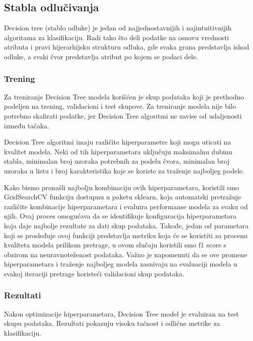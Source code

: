 \documentclass[a4paper,12pt]{article}
\begin{document}
\clearpage

\subsection{Stabla odlučivanja}
Decision tree (stablo odluke) je jedan od najjednostavnijih i najintuitivnijih algoritama za klasifikaciju. Radi tako što deli podatke na osnovu vrednosti atributa i pravi hijerarhijsku strukturu odluka, gde svaka grana predstavlja ishod odluke, a svaki čvor predstavlja atribut po kojem se podaci dele.


\subsubsection{Trening}

Za treniranje Decision Tree modela korišćen je skup podataka koji je prethodno podeljen na trening, validacioni i test skupove. Za treniranje modela nije bilo potrebno skalirati podatke, jer Decision Tree algoritmi ne zavise od udaljenosti između tačaka.

Decision Tree algoritmi imaju različite hiperparametre koji mogu uticati na kvalitet modela. Neki od tih hiperparametara uključuju maksimalnu dubinu stabla, minimalan broj uzoraka potrebnih za podelu čvora, minimalan broj uzoraka u listu i broj karakteristika koje se koriste za traženje najboljeg podele.

Kako bismo pronašli najbolju kombinaciju ovih hiperparametara, koristili smo GridSearchCV funkciju dostupnu u paketu sklearn, koja automatski pretražuje različite kombinacije hiperparametara i evaluira performanse modela za svaku od njih. Ovaj proces omogućava da se identifikuje konfiguracija hiperparametara koja daje najbolje rezultate za dati skup podataka. Takođe, jedan od parametara koji se prosleđuje ovoj funkciji predstavlja metriku koja će se koristiti za procenu kvaliteta modela prilikom pretrage, u ovom slučaju koristili smo f1 score s obzirom na neuravnoteženost podataka. Važno je napomenuti da se ove promene hiperparametara i traženje najboljeg modela zasnivaju na evaluaciji modela u svakoj iteraciji pretrage koristeći validacioni skup podataka.


\subsubsection{Rezultati}

Nakon optimizacije hiperparametara, Decision Tree model je evaluiran na test skupu podataka. Rezultati pokazuju visoku tačnost i odlične metrike za klasifikaciju.
\end{document}
